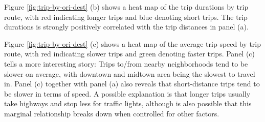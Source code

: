 \documentclass[10pt,a4paper]{article} %
\begin{document}
{    Figure \ref{fig:trip-by-ori-dest} (b) shows a heat map of the trip durations by trip route, with red indicating longer trips and blue denoting short trips. The trip durations is strongly positively correlated with the trip distances in panel (a).
    
    Figure \ref{fig:trip-by-ori-dest} (c) shows a heat map of the average trip speed by trip route, with red indicating slower trips and green denoting faster trips. Panel (c) tells a more interesting story: Trips to/from nearby neighborhoods tend to be slower on average, with downtown and midtown area being the slowest to travel in. Panel (c) together with panel (a) also reveals that short-distance trips tend to be slower in terms of speed. A possible explanation is that longer trips usually take highways and stop less for traffic lights, although is also possible that this marginal relationship breaks down when controlled for other factors.
    
}
\end{document}
